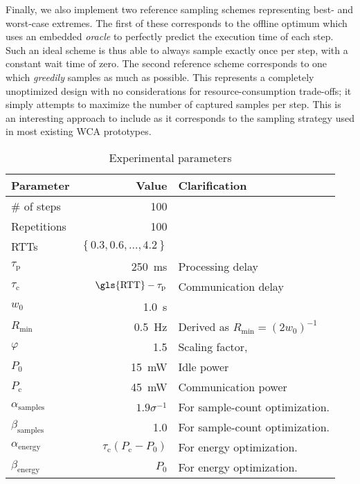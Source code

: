Finally, we also implement two reference sampling schemes representing best- and worst-case extremes.
The first of these corresponds to the offline optimum which uses an embedded \emph{oracle} to perfectly predict the execution time of each step.
Such an ideal scheme is thus able to always sample exactly once per step, with a constant wait time of zero.
The second reference scheme corresponds to one which \emph{greedily} samples as much as possible.
This represents a completely unoptimized design with no considerations for resource-consumption trade-offs; it simply attempts to maximize the number of captured samples per step.
This is an interesting approach to include as it corresponds to the sampling strategy used in most existing \gls{WCA} prototypes.

\begin{table}
    \centering
    \caption{Experimental parameters}\label{tab:params}
    \begin{tabular}{lrl}
        \toprule
        Parameter & Value & Clarification \\
        \midrule
        \# of steps & \num{100} & \\
        Repetitions & \num{100} & \\
        \glspl{RTT} & \( \left\{ 0.3, 0.6,\ldots,4.2 \right\} \) & \\
        \( \tau_\text{p} \) & \SI{250}{\milli\second} & Processing delay \\
        \( \tau_\text{c} \) & \( \text{\gls{RTT}} - \tau_\text{p} \) & Communication delay \\
        \( w_0 \) & \SI{1.0}{\second} & \\
        \( R_\text{min} \) & \SI{0.5}{\hertz} & Derived as \( R_\text{min} = {(2 w_0)}^{-1} \) \\
        \( \varphi \) & \num{1.5} & Scaling factor, \textcite{wang2019towards}\\
        \( P_0 \) & \SI{15}{\milli\watt} & Idle power \\
        \( P_\text{c} \) & \SI{45}{\milli\watt} & Communication power \\
        \( \alpha_\text{samples} \) & \( 1.9 \sigma^{-1} \) & For sample-count optimization. \\
        \( \beta_\text{samples} \) & \num{1.0} & For sample-count optimization. \\
        \( \alpha_\text{energy} \) & \( \tau_\text{c}(P_\text{c} - P_0) \) & For energy optimization. \\
        \( \beta_\text{energy} \) & \( P_0 \) & For energy optimization. \\
        \bottomrule
    \end{tabular}
\end{table}

